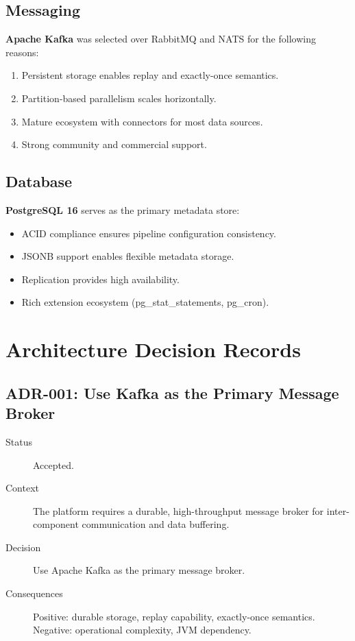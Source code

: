\documentclass[
    language=english,
    doctype=technical-report,
    institution=none,
    titlestyle=book,
    oneside,
]{../../omnilatex}
\begin{document}
\section{Messaging}

\textbf{Apache Kafka} was selected over RabbitMQ and NATS for the
following reasons:

\begin{enumerate}
    \item Persistent storage enables replay and exactly-once semantics.
    \item Partition-based parallelism scales horizontally.
    \item Mature ecosystem with connectors for most data sources.
    \item Strong community and commercial support.
\end{enumerate}

\section{Database}

\textbf{PostgreSQL 16} serves as the primary metadata store:

\begin{itemize}
    \item ACID compliance ensures pipeline configuration consistency.
    \item JSONB support enables flexible metadata storage.
    \item Replication provides high availability.
    \item Rich extension ecosystem (pg\_stat\_statements, pg\_cron).
\end{itemize}

\chapter{Architecture Decision Records}
\label{sec:adr}

\section{ADR-001: Use Kafka as the Primary Message Broker}

\begin{description}
    \item[Status] Accepted.
    \item[Context] The platform requires a durable, high-throughput message
        broker for inter-component communication and data buffering.
    \item[Decision] Use Apache Kafka as the primary message broker.
    \item[Consequences] Positive: durable storage, replay capability,
        exactly-once semantics. Negative: operational complexity, JVM
        dependency.
\end{description}
\end{document}
